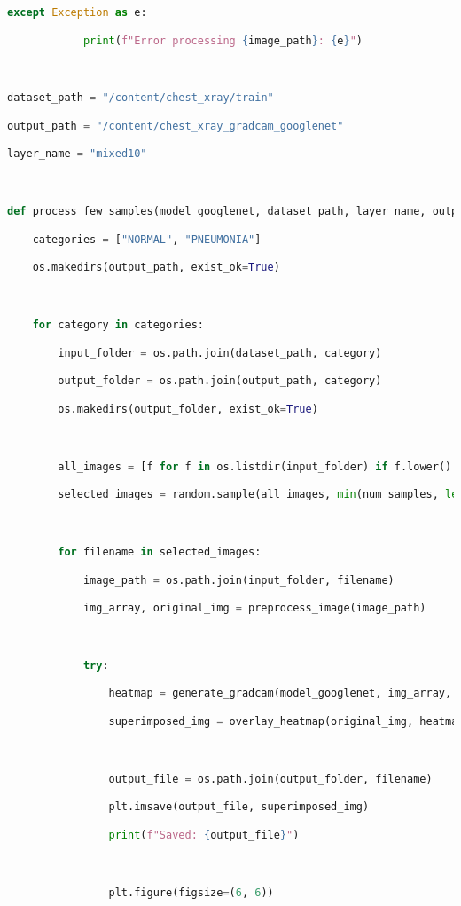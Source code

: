 \documentclass{article}
\begin{document}
\begin{lstlisting}[style=mystyle,language=Python]
        except Exception as e:

            print(f"Error processing {image_path}: {e}")



dataset_path = "/content/chest_xray/train"

output_path = "/content/chest_xray_gradcam_googlenet"

layer_name = "mixed10"



def process_few_samples(model_googlenet, dataset_path, layer_name, output_path, num_samples=5):

    categories = ["NORMAL", "PNEUMONIA"]

    os.makedirs(output_path, exist_ok=True)



    for category in categories:

        input_folder = os.path.join(dataset_path, category)

        output_folder = os.path.join(output_path, category)

        os.makedirs(output_folder, exist_ok=True)



        all_images = [f for f in os.listdir(input_folder) if f.lower().endswith(('.jpg', '.jpeg', '.png'))]

        selected_images = random.sample(all_images, min(num_samples, len(all_images)))



        for filename in selected_images:

            image_path = os.path.join(input_folder, filename)

            img_array, original_img = preprocess_image(image_path)



            try:

                heatmap = generate_gradcam(model_googlenet, img_array, layer_name)

                superimposed_img = overlay_heatmap(original_img, heatmap)



                output_file = os.path.join(output_folder, filename)

                plt.imsave(output_file, superimposed_img)

                print(f"Saved: {output_file}")



                plt.figure(figsize=(6, 6))


\end{lstlisting}
\end{document}
